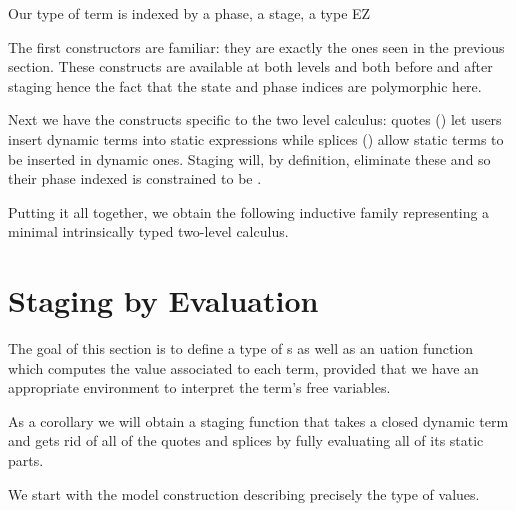 \documentclass{article}
\begin{document}

Our type of term is indexed by a phase, a stage, a type EZ


The first constructors are familiar: they are exactly the ones
seen in the previous section. These constructs are available
at both levels and both before and after staging hence the fact
that the state and phase indices are polymorphic here.


Next we have the constructs specific to the two level calculus:
quotes () let users insert dynamic terms into static
expressions while splices () allow static terms to
be inserted in dynamic ones.
%
Staging will, by definition, eliminate these and so their phase
indexed is constrained to be .



Putting it all together, we obtain the following inductive
family representing a minimal intrinsically typed two-level
calculus.

\begin{AgdaAlign}
  \begin{AgdaSuppressSpace}
  \end{AgdaSuppressSpace}
\end{AgdaAlign}


\section{Staging by Evaluation}

The goal of this section is to define a type of s
as well as an uation function which computes the
value associated to each term, provided that we have an
appropriate environment to interpret the term's free variables.


As a corollary we will obtain a staging function
that takes a closed dynamic term and gets rid of all of
the quotes and splices by fully
evaluating all of its static parts.


We start with the model construction describing precisely
the type of values.
\end{document}
